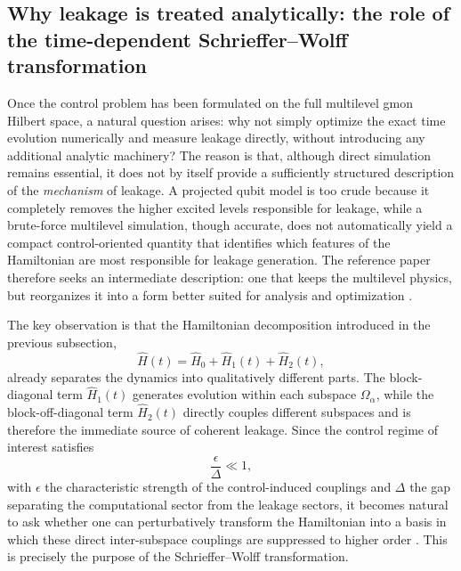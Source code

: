 \subsection{Why leakage is treated analytically: the role of the time-dependent Schrieffer--Wolff transformation}
\label{subsec:why_tswt_is_used}

Once the control problem has been formulated on the full multilevel gmon Hilbert space, a natural question arises: why not simply optimize the exact time evolution numerically and measure leakage directly, without introducing any additional analytic machinery? The reason is that, although direct simulation remains essential, it does not by itself provide a sufficiently structured description of the \emph{mechanism} of leakage. A projected qubit model is too crude because it completely removes the higher excited levels responsible for leakage, while a brute-force multilevel simulation, though accurate, does not automatically yield a compact control-oriented quantity that identifies which features of the Hamiltonian are most responsible for leakage generation. The reference paper therefore seeks an intermediate description: one that keeps the multilevel physics, but reorganizes it into a form better suited for analysis and optimization \cite{Niu2019}.

The key observation is that the Hamiltonian decomposition introduced in the previous subsection,
\begin{equation}
\hat{H}(t)=\hat{H}_0+\hat{H}_1(t)+\hat{H}_2(t),
\label{eq:tswt_starting_hamiltonian}
\end{equation}
already separates the dynamics into qualitatively different parts. The block-diagonal term $\hat{H}_1(t)$ generates evolution within each subspace $\Omega_\alpha$, while the block-off-diagonal term $\hat{H}_2(t)$ directly couples different subspaces and is therefore the immediate source of coherent leakage. Since the control regime of interest satisfies
\begin{equation}
\frac{\epsilon}{\Delta}\ll 1,
\label{eq:tswt_small_parameter}
\end{equation}
with $\epsilon$ the characteristic strength of the control-induced couplings and $\Delta$ the gap separating the computational sector from the leakage sectors, it becomes natural to ask whether one can perturbatively transform the Hamiltonian into a basis in which these direct inter-subspace couplings are suppressed to higher order \cite{Niu2019}. This is precisely the purpose of the Schrieffer--Wolff transformation.

